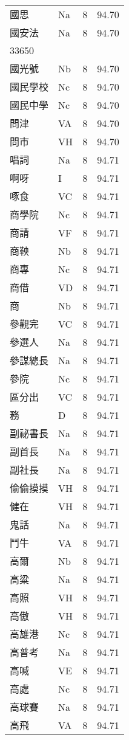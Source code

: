 \documentclass[twocolumn]{book}
\begin{document}
\begin{supertabular}{llrr}
國思 & Na & 8 &  94.70\\
國安法 & Na & 8 &  94.70\\
33650\\
國光號 & Nb & 8 &  94.70\\
國民學校 & Nc & 8 &  94.70\\
國民中學 & Nc & 8 &  94.70\\
問津 & VA & 8 &  94.70\\
問市 & VH & 8 &  94.70\\
唱詞 & Na & 8 &  94.71\\
啊呀 & I & 8 &  94.71\\
啄食 & VC & 8 &  94.71\\
商學院 & Nc & 8 &  94.71\\
商請 & VF & 8 &  94.71\\
商鞅 & Nb & 8 &  94.71\\
商專 & Nc & 8 &  94.71\\
商借 & VD & 8 &  94.71\\
商 & Nb & 8 &  94.71\\
參觀完 & VC & 8 &  94.71\\
參選人 & Na & 8 &  94.71\\
參謀總長 & Na & 8 &  94.71\\
參院 & Nc & 8 &  94.71\\
區分出 & VC & 8 &  94.71\\
務 & D & 8 &  94.71\\
副祕書長 & Na & 8 &  94.71\\
副首長 & Na & 8 &  94.71\\
副社長 & Na & 8 &  94.71\\
偷偷摸摸 & VH & 8 &  94.71\\
健在 & VH & 8 &  94.71\\
鬼話 & Na & 8 &  94.71\\
鬥牛 & VA & 8 &  94.71\\
高爾 & Nb & 8 &  94.71\\
高粱 & Na & 8 &  94.71\\
高照 & VH & 8 &  94.71\\
高傲 & VH & 8 &  94.71\\
高雄港 & Nc & 8 &  94.71\\
高普考 & Na & 8 &  94.71\\
高喊 & VE & 8 &  94.71\\
高處 & Nc & 8 &  94.71\\
高球賽 & Na & 8 &  94.71\\
高飛 & VA & 8 &  94.71\\

\end{supertabular}
\end{document}
